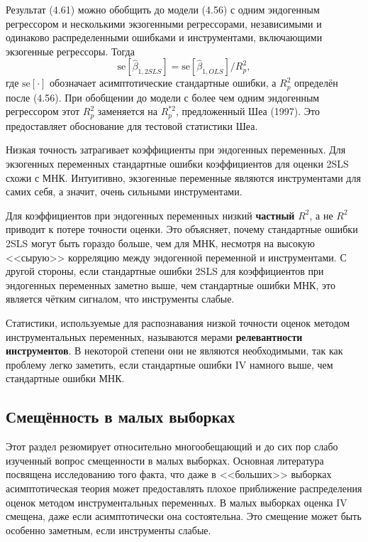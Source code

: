 Результат (4.61) можно обобщить до модели (4.56) с одним эндогенным регрессором и несколькими экзогенными регрессорами, независимыми и одинаково распределенными ошибками и инструментами, включающими экзогенные регрессоры. Тогда
\begin{equation}
\mathrm{se}[\hat{\beta}_{1,2SLS}] = \mathrm{se}[\hat{\beta}_{1,OLS}]/R^2_p,
\end{equation}
где $\mathrm{se}[\cdot]$ обозначает асимптотические стандартные ошибки, а $R^2_p$ определён после (4.56). При обобщении до модели с более чем одним эндогенным регрессором этот $R^2_p$ заменяется на $R^{*2}_p$, предложенный Шеа (1997). Это предоставляет обоснование для тестовой  статистики Шеа.

Низкая точность затрагивает коэффициенты при эндогенных переменных. Для экзогенных переменных стандартные ошибки коэффициентов для оценки 2SLS схожи с  МНК. Интуитивно, экзогенные переменные являются инструментами для самих себя, а значит, очень сильными инструментами.

Для коэффициентов при эндогенных переменных низкий \textbf{частный} $R^2$, а не $R^2$ приводит к потере точности оценки. Это объясняет, почему стандартные ошибки 2SLS могут быть гораздо больше, чем для МНК, несмотря на высокую <<сырую>> корреляцию между эндогенной переменной и инструментами. С другой стороны, если стандартные ошибки 2SLS для коэффициентов при эндогенных переменных заметно выше, чем стандартные ошибки МНК, это является чётким сигналом, что инструменты слабые.

Статистики, используемые для распознавания низкой точности оценок методом инструментальных переменных, называются мерами \textbf{релевантности инструментов}. В некоторой степени они не являются необходимыми, так как проблему легко заметить, если стандартные ошибки IV намного выше, чем стандартные ошибки МНК.

\subsection{Смещённость в малых выборках}

Этот раздел резюмирует относительно многообещающий и до сих пор слабо изученный вопрос смещенности в малых выборках. Основная литература посвящена исследованию того факта, что даже в <<больших>> выборках асимптотическая теория может предоставлять плохое приближение распределения оценок методом инструментальных переменных. В малых выборках оценка IV смещена, даже если асимптотически она состоятельна. Это смещение может быть особенно заметным, если инструменты слабые.

